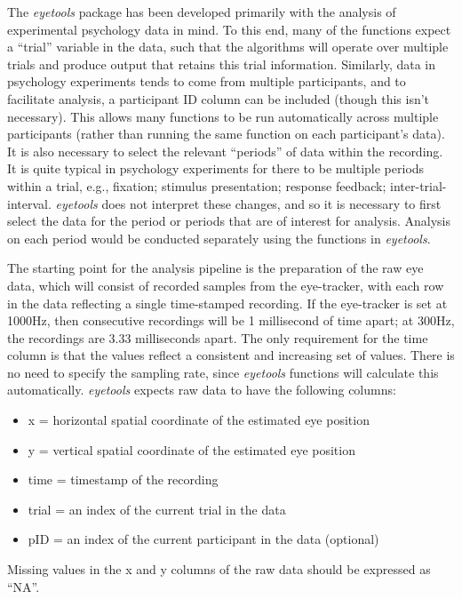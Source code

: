 \documentclass[
  man,
  floatsintext,
  longtable,
  nolmodern,
  notxfonts,
  notimes,
  colorlinks=true,linkcolor=blue,citecolor=blue,urlcolor=blue]{apa7}
\begin{document}
The \emph{eyetools} package has been developed primarily with the
analysis of experimental psychology data in mind. To this end, many of
the functions expect a ``trial'' variable in the data, such that the
algorithms will operate over multiple trials and produce output that
retains this trial information. Similarly, data in psychology
experiments tends to come from multiple participants, and to facilitate
analysis, a participant ID column can be included (though this isn't
necessary). This allows many functions to be run automatically across
multiple participants (rather than running the same function on each
participant's data). It is also necessary to select the relevant
``periods'' of data within the recording. It is quite typical in
psychology experiments for there to be multiple periods within a trial,
e.g., fixation; stimulus presentation; response feedback;
inter-trial-interval. \emph{eyetools} does not interpret these changes,
and so it is necessary to first select the data for the period or
periods that are of interest for analysis. Analysis on each period would
be conducted separately using the functions in \emph{eyetools}.

The starting point for the analysis pipeline is the preparation of the
raw eye data, which will consist of recorded samples from the
eye-tracker, with each row in the data reflecting a single time-stamped
recording. If the eye-tracker is set at 1000Hz, then consecutive
recordings will be 1 millisecond of time apart; at 300Hz, the recordings
are 3.33 milliseconds apart. The only requirement for the time column is
that the values reflect a consistent and increasing set of values. There
is no need to specify the sampling rate, since \emph{eyetools} functions
will calculate this automatically. \emph{eyetools} expects raw data to
have the following columns:

\begin{itemize}
\item
  x = horizontal spatial coordinate of the estimated eye position
\item
  y = vertical spatial coordinate of the estimated eye position
\item
  time = timestamp of the recording
\item
  trial = an index of the current trial in the data
\item
  pID = an index of the current participant in the data (optional)
\end{itemize}

Missing values in the x and y columns of the raw data should be
expressed as ``NA''.
\end{document}
